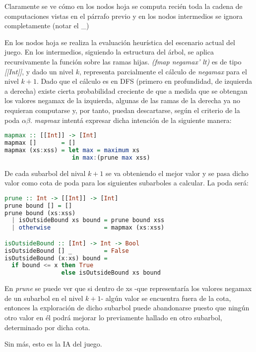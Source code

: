 \documentclass{llncs}
\begin{document}
Claramente se ve cómo en los nodos hoja se computa recién toda la cadena de computaciones vistas en el párrafo previo y  en los nodos intermedios se ignora completamente (notar el \_)

En los nodos hoja se realiza la evaluación heurística del escenario actual del juego. En los intermedios, siguiendo la estructura del árbol, se aplica recursivamente la función sobre las ramas hijas. \textit{(fmap negamax' lt)} es de tipo \textit{[[Int]]}, y dado un nivel $k$, representa parcialmente el cálculo de \textit{negamax} para el nivel $k+1$. Dado que el cálculo es en DFS (primero en profundidad, de izquierda a derecha) existe cierta probabilidad creciente de que a medida que se obtengan los valores negamax de la izquierda, algunas de las ramas de la derecha ya no requieran computarse y, por tanto, puedan descartarse, según el criterio de la poda $\alpha\beta$. \textit{mapmax} intentá expresar dicha intención de la siguiente manera:

\begin{lstlisting}[frame=single, language=haskell, captionpos=b, caption=Definición de mapmax]
mapmax :: [[Int]] -> [Int]
mapmax []       = []
mapmax (xs:xss) = let max = maximum xs
                   in max:(prune max xss)
\end{lstlisting}

De cada subarbol del nival $k+1$ se va obteniendo el mejor valor y se pasa dicho valor como cota de poda para los siguientes subarboles a calcular. La poda será:

\begin{lstlisting}[frame=single, language=haskell, captionpos=b, caption=Definición de prune]
prune :: Int -> [[Int]] -> [Int]
prune bound [] = []
prune bound (xs:xss)
  | isOutsideBound xs bound = prune bound xss
  | otherwise               = mapmax (xs:xss)

isOutsideBound :: [Int] -> Int -> Bool
isOutsideBound [] _         = False
isOutsideBound (x:xs) bound =
  if bound <= x then True
                else isOutsideBound xs bound
\end{lstlisting}

En \textit{prune} se puede ver que si dentro de xs -que representaría los valores negamax de un subarbol en el nivel $k+1$- algún valor se encuentra fuera de la cota, entonces la exploración de dicho subarbol puede abandonarse puesto que ningún otro valor en él podrá mejorar lo previamente hallado en otro subarbol, determinado por dicha cota.

Sin más, esto es la IA del juego.
\end{document}

